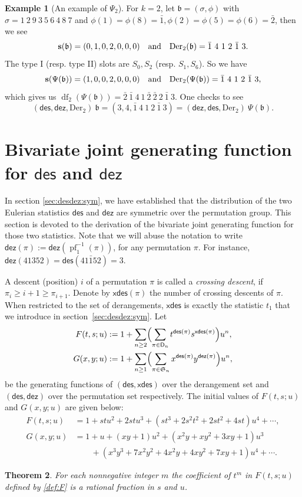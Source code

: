 \documentclass[12pt]{amsart}
\numberwithin{equation}{section}
\theoremstyle{plain}
\newtheorem{theorem}{Theorem}[section]
\theoremstyle{definition}
\newtheorem{example}[theorem]{Example}
\newcommand\D{\mathsf{D}}
\def\dez{\mathsf{dez}}
\def\xdes{\mathsf{xdes}}
\def\Der{\mathrm{Der}}
\def\des{\mathsf{des}}
\def\S{\mathfrak{S}}
\def\b{\mathfrak{b}}
\def\s{\operatorname{{\bf s}}}
\def\df{\operatorname{df}}
\def\pf{\operatorname{pf}}
\def\s{\operatorname{{\bf s}}}
\def\neg#1{{{{\bar#1}}}}
\begin{document}
\begin{example}[An example of $\Psi_2$]
For $k=2$, let $\b=(\sigma,\phi)$ with $\sigma=1~2~9~3~5~6~4~8~7$ and $\phi(1)=\phi(8)=\neg 1,\phi(2)=\phi(5)=\phi(6)=\neg 2$, then we see
$$\s(\b)=(0,1,0,2,0,0,0)\quad\text{and}\quad \Der_2(\b)=\neg 1~4~1~2~\neg 1~3.$$
The type I (resp. type II) slots are $S_0,S_2$ (resp. $S_1,S_6$). So we have
$$\s(\Psi(\b))=(1,0,0,2,0,0,0)\quad\text{and}\quad \Der_2(\Psi(\b))=\neg 1~4~1~2~\neg 1~3,$$
which gives us $\df_2(\Psi(\b))=\neg 2~\neg 1~4~1~\neg 2~\neg 2~2~\neg 1~3$. One checks to see
$$(\des, \dez, \Der_2)~\b = (3, 4, \neg 1~4~1~2~\neg 1~3) = (\dez, \des, \Der_2)~\Psi(\b).$$
\end{example}




\section{Bivariate joint generating function for \texorpdfstring{$\des$ and $\dez$}{des and dez}} 

\label{sec:4}
In section \ref{sec:desdez:sym}, we have established that the distribution of the  two Eulerian statistics $\des$ and $\dez$ are symmetric over the permutation group. This section is devoted to the derivation of the bivariate joint generating function for those two statistics. Note that we will abuse the notation to write $\dez(\pi):=\dez(\pf_1^{-1}(\pi))$, for any permutation $\pi$. For instance, $\dez(41352)=\des(41\neg 152)=3$.

A descent (position) $i$ of a permutation $\pi$ is called a {\em crossing descent}, if $\pi_i\ge i+1\ge \pi_{i+1}$. Denote by $\xdes(\pi)$ the number of crossing descents of $\pi$. When restricted to the set of derangements, $\xdes$ is exactly the statistic $t_1$ that we introduce in section~\ref{sec:desdez:sym}. Let
\begin{align}
	\label{def:F}F(t,s; u)&:=1+\sum_{n\geq 2} \Bigl( \sum_{\pi\in \D_n} 
	 t^{\des(\pi)}  s^{\xdes(\pi)} \Bigr) u^n,\\
	\label{def:G}G(x,y; u)&:=1+\sum_{n\geq 1} \Bigl( \sum_{\pi\in{\S}_n} 
	 x^{\des(\pi)} y^{\dez(\pi)} \Bigr) u^n,
\end{align} 
be the generating functions of $(\des, \xdes)$ over the derangement set and $(\des, \dez)$ over the permutation set respectively. The initial values of $F(t,s;u)$ and $G(x,y;u)$ are given below:
\begin{align*}
	F(t,s;u)&= 1+ stu^2 + 2s t u^3 + ( st^3 +  2s^2t^2 + 2st^2 + 4st) u^4 + \cdots , \\
	G(x,y;u)&= 1+ u +    (xy+1)u^2   + (x^2y + xy^2 + 3xy + 1)u^3   \\
	& \qquad + (x^3y^3 + 7x^2y^2 + 4x^2y + 4xy^2 + 7xy + 1)u^4 + \cdots.
\end{align*}
\begin{theorem}\label{th:rational}
	For each nonnegative integer $m$ the coefficient of $t^m$ in $F(t,s;u)$ defined by \eqref{def:F} is a {\it rational fraction} in $s$ and $u$.
\end{theorem}
\end{document}
